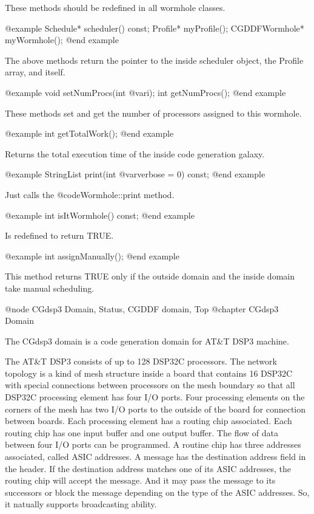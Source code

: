 {These methods should be redefined in all wormhole classes.

@example
Schedule* scheduler() const;
Profile* myProfile();
CGDDFWormhole* myWormhole();
@end example

The above methods return the pointer to the inside scheduler object,
the Profile array, and itself.

@example
void setNumProcs(int @var{i});
int getNumProcs();
@end example

These methods set and get the number of processors assigned to this wormhole.

@example
int getTotalWork();
@end example

Returns the total execution time of the inside code generation galaxy.

@example
StringList print(int @var{verbose} = 0) const;
@end example

Just calls the @code{Wormhole::print} method.

@example
int isItWormhole() const;
@end example

Is redefined to return TRUE.

@example
int assignManually();
@end example

This method returns TRUE only if the outside domain and the inside domain take
manual scheduling.

@node CGdsp3 Domain, Status, CGDDF domain, Top
@chapter CGdsp3 Domain

The CGdsp3 domain is a code generation domain for AT&T DSP3 machine.

The AT&T DSP3 consists of up to 128 DSP32C processors. The network
topology is a kind of mesh structure inside a board that contains 16 DSP32C
with special connections between processors on the mesh boundary so that
all DSP32C processing element has four I/O ports. Four processing elements
on the corners of the mesh has two I/O ports to the outside of the board for
connection between boards. Each processing element has a routing chip
associated. Each routing chip has one input buffer and one output buffer.
The flow of data between four I/O ports can be programmed. A routine chip
has three addresses associated, called ASIC addresses. A message has the
destination address field in the header. If the destination address
matches one of its ASIC addresses, the routing chip will accept the message.
And it may pass the message to its successors or block the message depending
on the type of the ASIC addresses. So, it natually supports broadcasting
ability.

}
